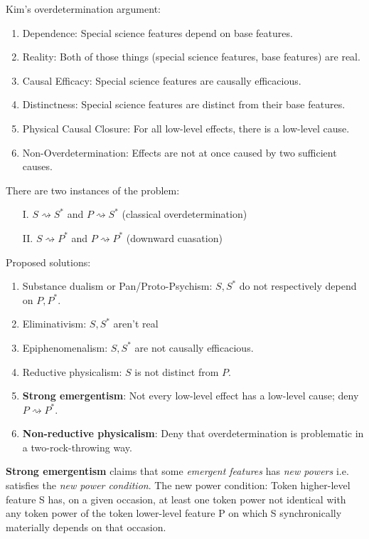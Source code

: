 \documentclass{article}
\newcommand{\ti}[1]{\textit{#1}}
\newcommand{\tb}[1]{\textbf{#1}}
\begin{document}
\smallskip
\noindent Kim's overdetermination argument:
\begin{enumerate}
    \item Dependence: Special science features depend on base features.
    \item Reality: Both of those things (special science features, base features) are real.
    \item Causal Efficacy: Special science features are causally efficacious.
    \item Distinctness: Special science features are distinct from their base features.
    \item Physical Causal Closure: For all low-level effects, there is a low-level cause.
    \item Non-Overdetermination: Effects are not at once caused by two sufficient causes.
\end{enumerate}

\noindent There are two instances of the problem:
\begin{enumerate}
    \item[I.] $S \rightsquigarrow S^*$ and $P \rightsquigarrow S^*$ (classical overdetermination)
    \item[II.] $S \rightsquigarrow P^*$ and $P \rightsquigarrow P^*$ (downward cuasation)
\end{enumerate}

\noindent Proposed solutions:
\begin{enumerate}
    \item Substance dualism or Pan/Proto-Psychism: $S, S^*$ do not respectively depend on $P, P^*$.
    \item Eliminativism: $S, S^*$ aren't real
    \item Epiphenomenalism: $S, S^*$ are not causally efficacious.
    \item Reductive physicalism: $S$ is not distinct from $P$.
    \item \tb{Strong emergentism}: Not every low-level effect has a low-level cause; deny $P \rightsquigarrow P^*$.
    \item \tb{Non-reductive physicalism}: Deny that overdetermination is problematic in a two-rock-throwing way.
\end{enumerate}

\tb{Strong emergentism} claims that some \ti{emergent features} has \ti{new powers} i.e. satisfies the \ti{new power condition}. The new power condition: Token higher-level feature S has, on a given occasion, at least one token power not identical with any token power of the token lower-level feature P on which S synchronically materially depends on that occasion.
\end{document}
